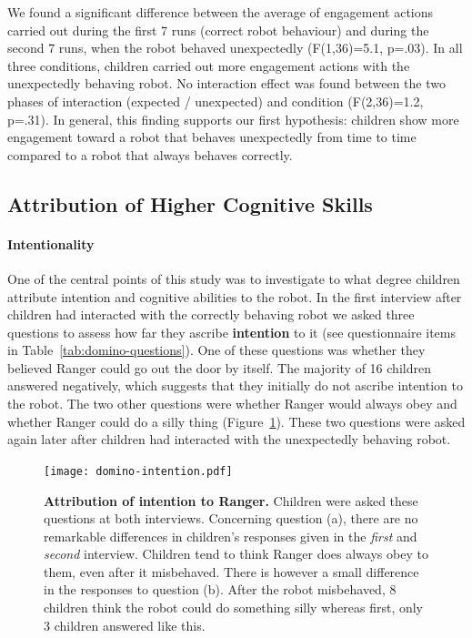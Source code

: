 \documentclass[letterpaper, 10pt, conference]{ieeeconf}
\begin{document}
We found a significant difference between the average of engagement
actions carried out during the first 7 runs (correct robot behaviour) and during
the second 7 runs, when the robot behaved unexpectedly (F(1,36)=5.1, p=.03). In
all three conditions, children carried out more engagement actions with the
unexpectedly behaving robot. No interaction effect was found between the two
phases of interaction (expected / unexpected) and condition (F(2,36)=1.2,
p=.31). In general, this finding supports our first hypothesis: children show
more engagement toward a robot that behaves unexpectedly from time to time
compared to a robot that always behaves correctly.

\subsection{Attribution of Higher Cognitive Skills}

\paragraph{Intentionality}

One of the central points of this study was to investigate to what degree
children attribute intention and cognitive abilities to the robot.  In the first
interview after children had interacted with the correctly behaving robot we
asked three questions to assess how far they ascribe \textbf{intention} to it
(see questionnaire items in Table~\ref{tab:domino-questions}). One of these
questions was whether they believed Ranger could go out the door by itself. The
majority of 16 children answered negatively, which suggests that they initially
do not ascribe intention to the robot. The two other questions were whether
Ranger would always obey and whether Ranger could do a silly thing
(Figure~\ref{fig:domino-intention}). These two questions were asked again later
after children had interacted with the unexpectedly behaving robot.


\begin{figure}[h]
    \centering
    \texttt{[image: domino-intention.pdf]}
    \caption{\small \textbf{Attribution of intention to Ranger.} Children were
        asked these questions at both interviews. Concerning question (a), there
        are no remarkable differences in children's responses given in the
        \textit{first} and \textit{second} interview.  Children tend to think
        Ranger does always obey to them, even after it misbehaved. There is
        however a small difference in the responses to question (b).  After the
        robot misbehaved, 8 children think the robot could do something silly whereas
        first, only 3 children answered like this.}
    
    \label{fig:domino-intention}

\end{figure}
\end{document}
